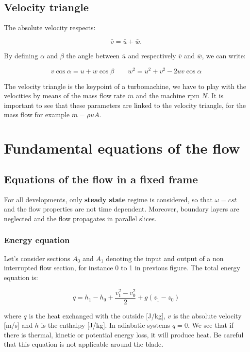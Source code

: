 \subsection{Velocity triangle}
The absolute velocity respects: 

\begin{equation}
\bar{v} = \bar{u} + \bar{w}.
\end{equation}

By defining $\alpha$ and $\beta$ the angle between $\bar{u}$ and respectively $\bar{v}$ and $\bar{w}$, we can write: 

\begin{equation}
v \cos \alpha = u + w\cos \beta \qquad w^2 = u^2 + v^2 - 2uv\cos \alpha
\end{equation}

The velocity triangle is the keypoint of a turbomachine, we have to play with the velocities by means of the mass flow rate $\dot{m}$ and the machine rpm $N$. It is important to see that these parameters are linked to the velocity triangle, for the mass flow for example $\dot{m} = \rho u A$. 


\section{Fundamental equations of the flow}
\subsection{Equations of the flow in a fixed frame}
For all developments, only \textbf{steady state} regime is considered, so that $\omega = cst$ and the flow properties are not time dependent. Moreover, boundary layers are neglected and the flow propagates in parallel slices. 

\subsubsection{Energy equation}
Let's consider sections $A_0$ and $A_1$ denoting the input and output of a non interrupted flow section, for instance 0 to 1 in previous figure. The total energy equation is: 

\begin{equation}
q = h_1 - h_0 + \frac{v_1^2 - v_0^2}{2} + g(z_1-z_0)
\label{2.1}
\end{equation}

where $q$ is the heat exchanged with the outside [J/kg], $v$ is the absolute velocity [m/s] and $h$ is the enthalpy [J/kg]. In adiabatic systems $q=0$. We see that if there is thermal, kinetic or potential energy loss, it will produce heat. Be careful that this equation is not applicable around the blade. 

